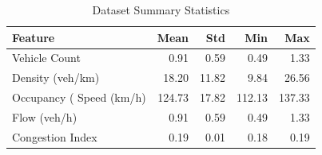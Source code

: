 \begin{table}[h]
\centering
\caption{Dataset Summary Statistics}
\label{tab:dataset}
\begin{tabular}{lrrrr}
\hline
Feature & Mean & Std & Min & Max \\
\hline
Vehicle Count & 0.91 & 0.59 & 0.49 & 1.33 \\
Density (veh/km) & 18.20 & 11.82 & 9.84 & 26.56 \\
Occupancy (%
Speed (km/h) & 124.73 & 17.82 & 112.13 & 137.33 \\
Flow (veh/h) & 0.91 & 0.59 & 0.49 & 1.33 \\
Congestion Index & 0.19 & 0.01 & 0.18 & 0.19 \\
\hline
\end{tabular}
\end{table}